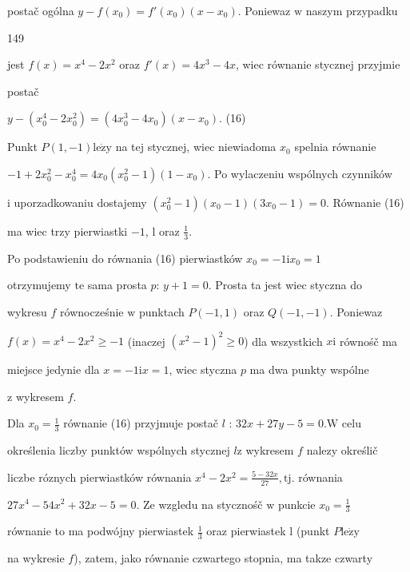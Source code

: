 \documentclass[a4paper,12pt]{article}
\begin{document}
postač ogólna $y-f(x_{0}) =f'(x_{0})(x-x_{0})$. Poniewaz $\mathrm{w}$ naszym przypadku





149

jest $f(x)=x^{4}-2x^{2}$ oraz $f'(x)=4x^{3}-4x$, wiec równanie stycznej przyjmie

postač

$y-(x_{0}^{4}-2x_{0}^{2})=(4x_{0}^{3}-4x_{0})(x-x_{0})$.   (16)

Punkt $P(1,-1)\mathrm{l}\mathrm{e}\dot{\mathrm{z}}\mathrm{y}$ na tej stycznej, wiec niewiadoma $x_{0}$ spelnia równanie

$-1+2x_{0}^{2}-x_{0}^{4}=4x_{0}(x_{0}^{2}-1)(1-x_{0})$. Po wylaczeniu wspólnych czynników

$\mathrm{i}$ uporzadkowaniu dostajemy $(x_{0}^{2}-1)(x_{0}-1)(3x_{0}-1)=0$. Równanie (16)

ma wiec trzy pierwiastki $-1$, l oraz $\displaystyle \frac{1}{3}.$

Po podstawieniu do równania (16) pierwiastków $x_{0} = -1 \mathrm{i} x_{0} = 1$

otrzymujemy $\mathrm{t}\mathrm{e}$ sama prosta $p$: $y+1=0$. Prosta ta jest wiec styczna do

wykresu $f$ równocześnie $\mathrm{w}$ punktach $P(-1,1)$ oraz $Q(-1,-1)$. Poniewaz

$f(x)=x^{4}-2x^{2}\geq-1$ (inaczej $(x^{2}-1)^{2}\geq 0$) dla wszystkich $x\mathrm{i}$ równośč ma

miejsce jedynie dla $x=-1\mathrm{i}x=1$, wiec styczna $p$ ma dwa punkty wspólne

$\mathrm{z}$ wykresem $f.$

Dla $x_{0}=\displaystyle \frac{1}{3}$ równanie (16) przyjmuje postač $l$ : $32x+27y-5=0. \mathrm{W}$ celu

określenia liczby punktów wspólnych stycznej $l\mathrm{z}$ wykresem $f$ nalezy określič

liczbe róznych pierwiastków równania $x^{4}-2x^{2} = \displaystyle \frac{5-32x}{27}, \mathrm{t}\mathrm{j}$. równania

$27x^{4}-54x^{2}+32x-5 = 0$. Ze wzgledu na stycznośč $\mathrm{w}$ punkcie $x_{0} = \displaystyle \frac{1}{3}$

równanie to ma podwójny pierwiastek $\displaystyle \frac{1}{3}$ oraz pierwiastek l (punkt $P\mathrm{l}\mathrm{e}\dot{\mathrm{z}}\mathrm{y}$

na wykresie $f$), zatem, jako równanie czwartego stopnia, ma takze czwarty
\end{document}
